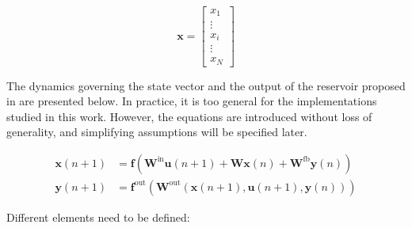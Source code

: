 \begin{equation}
	\mathbf{x} = \begin{bmatrix}
		x_1\\
		\vdots \\
		x_i \\
		\vdots \\
		x_N
	\end{bmatrix}
\end{equation}

\newpage

The dynamics governing the state vector and the output of the reservoir proposed in \cite{JaegerH.2001Tesa} are presented below. In practice, it is too general for the implementations studied in this work. However, the equations are introduced without loss of generality, and simplifying assumptions will be specified later.

\begin{align}
	\mathbf{x}(n+1) &= \mathbf{f} \left( \mathbf{W}^{\text{in}} \mathbf{u}(n+1) + \mathbf{W} \mathbf{x}(n) + \mathbf{W}^{\text{fb}} \mathbf{y}(n) \right)\\
	\mathbf{y}(n+1) &= \mathbf{f}^{\text{out}} \left( \mathbf{W}^{\text{out}} \left(\mathbf{x}(n+1), \mathbf{u}(n+1), \mathbf{y}(n)\right) \right)
	\label{rc_dynamics}
\end{align}

Different elements need to be defined: 

